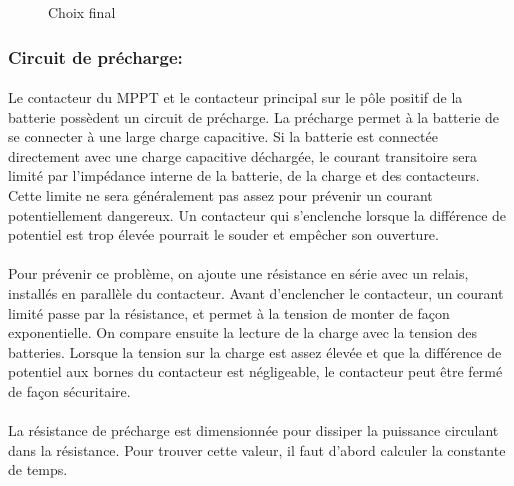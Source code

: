 		\begin{figure}[H]
			\centering
			\caption{Choix final}
			\label{fig:contactorsolfinal}
		\end{figure}

	\subsubsection*{Circuit de précharge:}
		\paragraph*{}
		Le contacteur du MPPT et le contacteur principal sur le pôle positif de la batterie possèdent un circuit de précharge. La précharge permet à la batterie de se connecter à une large charge capacitive. Si la batterie est connectée directement avec une charge capacitive déchargée, le courant transitoire sera limité par l'impédance interne de la batterie, de la charge et des contacteurs. Cette limite ne sera généralement pas assez pour prévenir un courant potentiellement dangereux. Un contacteur qui s'enclenche lorsque la différence de potentiel est trop élevée pourrait le souder et empêcher son ouverture\cite{System_Approach}.
		
		\paragraph*{}
		Pour prévenir ce problème, on ajoute une résistance en série avec un relais, installés en parallèle du contacteur. Avant d'enclencher le contacteur, un courant limité passe par la résistance, et permet à la tension de monter de façon exponentielle. On compare ensuite la lecture de la charge avec la tension des batteries. Lorsque la tension sur la charge est assez élevée et que la différence de potentiel aux bornes du contacteur est négligeable, le contacteur peut être fermé de façon sécuritaire\cite{System_Approach}.
		
		\paragraph*{}		
		La résistance de précharge est dimensionnée pour dissiper la puissance circulant dans la résistance. Pour trouver cette valeur, il faut d'abord calculer la constante de temps.
	

